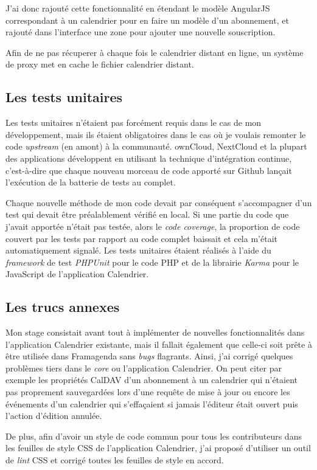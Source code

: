 \documentclass[10pt,a4paper]{report}
\begin{document}
	J'ai donc rajouté cette fonctionnalité en étendant le modèle AngularJS correspondant à un calendrier pour en faire un modèle d'un abonnement, et rajouté dans l'interface une zone pour ajouter une nouvelle souscription. 
	
	Afin de ne pas récuperer à chaque fois le calendrier distant en ligne, un système de proxy met en cache le fichier calendrier distant.
	
	\subsection{Les tests unitaires}
	Les tests unitaires n'étaient pas forcément requis dans le cas de mon développement, mais ils étaient obligatoires dans le cas où je voulais remonter le code \textit{upstream} (en amont) à la communauté. ownCloud, NextCloud et la plupart des applications développent en utilisant la technique d'intégration continue, c'est-à-dire que chaque nouveau morceau de code apporté sur Github lançait l'exécution de la batterie de tests au complet. 
	
	Chaque nouvelle méthode de mon code devait par conséquent s'accompagner d'un test qui devait être préalablement vérifié en local. Si une partie du code que j'avait apportée n'était pas testée, alors le \textit{code coverage}, la proportion de code couvert par les tests par rapport au code complet baissait et cela m'était automatiquement signalé. Les tests unitaires étaient réalisés à l'aide du \textit{framework} de test \textit{PHPUnit} pour le code PHP et de la librairie \textit{Karma} pour le JavaScript de l'application Calendrier.
	
	\subsection{Les trucs annexes}
	Mon stage consistait avant tout à implémenter de nouvelles fonctionnalités dans l'application Calendrier existante, mais il fallait également que celle-ci soit prête à être utilisée dans Framagenda sans \textit{bugs} flagrants. Ainsi, j'ai corrigé quelques problèmes tiers dans le \textit{core} ou l'application Calendrier.
	On peut citer par exemple les propriétés CalDAV d'un abonnement à un calendrier qui n'étaient pas proprement sauvegardées lors d'une requête de mise à jour ou encore les événements d'un calendrier qui s'effaçaient si jamais l'éditeur était ouvert puis l'action d'édition annulée. 
	
	De plus, afin d'avoir un style de code commun pour tous les contributeurs dans les feuilles de style CSS de l'application Calendrier, j'ai proposé d'utiliser un outil de \textit{lint} CSS et corrigé toutes les feuilles de style en accord. 
	
\end{document}
